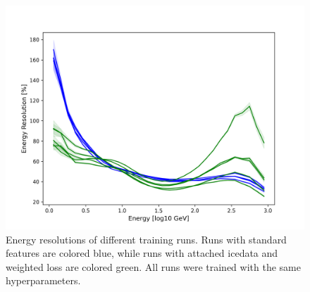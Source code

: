 \documentclass[a4paper,10pt]{scrartcl}
\begin{document}
\begin{figure}[H]
    \includegraphics[scale=0.65]{images/repeatability.png}
    \centering
    \caption{Energy resolutions of different training runs. Runs with standard features are colored blue, while runs with attached icedata and weighted loss are colored green. All runs were trained with the same hyperparameters.}
    \label{fig:repeatability}
\end{figure}


\newpage
\printbibliography
\end{document}
